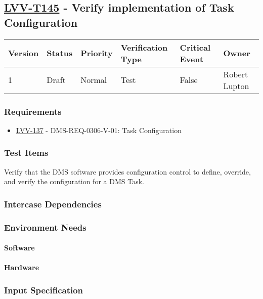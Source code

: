 \subsection{\href{https://jira.lsstcorp.org/secure/Tests.jspa\#/testCase/LVV-T145}{LVV-T145}
    - Verify implementation of Task Configuration}\label{lvv-t145}

\begin{longtable}[]{llllll}
\toprule
Version & Status & Priority & Verification Type & Critical Event & Owner
\\\midrule
1 & Draft & Normal &
Test & False & Robert Lupton
\\\bottomrule
\end{longtable}

\subsubsection{Requirements}
\begin{itemize}
\item \href{https://jira.lsstcorp.org/browse/LVV-137}{LVV-137} - DMS-REQ-0306-V-01: Task Configuration
\end{itemize}

\subsubsection{Test Items}
Verify that the DMS software provides configuration control to define,
override, and verify the configuration for a DMS Task.



\subsubsection{Intercase Dependencies}

\subsubsection{Environment Needs}

\paragraph{Software}

\paragraph{Hardware}

\subsubsection{Input Specification}

